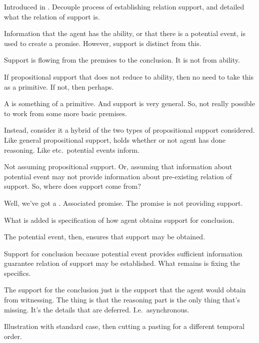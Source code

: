 \begin{note}[Promises]
  Introduced in \textcite{Liskov:1988vo}.
  Decouple process of establishing relation support, and detailed what the relation of support is.

  Information that the agent has the ability, or that there is a potential event, is used to create a promise.
  However, support is distinct from this.
\end{note}

\begin{note}
  Support is flowing from the premises to the conclusion.
  It is not from ability.

  If propositional support that does not reduce to ability, then no need to take this as a primitive.
  If not, then perhaps.
\end{note}

\begin{note}
  A \future{} is something of a primitive.
  And support is very general.
  So, not really possible to work from some more basic premises.

  Instead, consider it a hybrid of the two types of propositional support considered.
  Like general propositional support, holds whether or not agent has done reasoning.
  Like \citeauthor{Goldman:1979ui} etc.\ potential events inform.

  Not assuming propositional support.
  Or, assuming that information about potential event may not provide information about pre-existing relation of support.
  So, where does support come from?

  Well, we've got a \future{}.
  Associated promise.
  The promise is not providing support.

  What is added is specification of how agent obtains support for conclusion.

  The potential event, then, ensures that support may be obtained.

  Support for conclusion because potential event provides sufficient information guarantee relation of support may be established.
  What remains is fixing the specifics.

  The support for the conclusion just is the support that the agent would obtain from witnessing.
  The thing is that the reasoning part is the only thing that's missing.
  It's the details that are deferred.
  I.e.\ asynchronous.

  Illustration with standard case, then cutting a pasting for a different temporal order.
\end{note}

